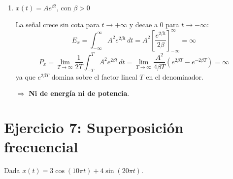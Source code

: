 \documentclass[10pt,a4paper]{article}
\begin{document}
\begin{enumerate}[label=\textbf{\alph*)}]
		$\Rightarrow$ \textbf{Señal de energía} con $E_x = 1/3$.
		
		\item $x(t)=Ae^{\beta t}$, con $\beta>0$
		
		La señal crece sin cota para $t\to+\infty$ y decae a $0$ para $t\to-\infty$:
		\[
		E_x = \int_{-\infty}^{\infty} A^2 e^{2\beta t}\,dt = A^2\left[\frac{e^{2\beta t}}{2\beta}\right]_{-\infty}^{\infty} = \infty
		\]
		\[
		P_x = \lim_{T\to\infty}\frac{1}{2T}\int_{-T}^{T} A^2 e^{2\beta t}\,dt = \lim_{T\to\infty}\frac{A^2}{4\beta T}\left(e^{2\beta T}-e^{-2\beta T}\right) = \infty
		\]
		ya que $e^{2\beta T}$ domina sobre el factor lineal $T$ en el denominador.
		
		$\Rightarrow$ \textbf{Ni de energía ni de potencia}.
	\end{enumerate}

	\section*{Ejercicio 7: Superposición frecuencial}
	
	Dada $x(t) = 3\cos(10\pi t) + 4\sin(20\pi t)$.
	
\end{document}

